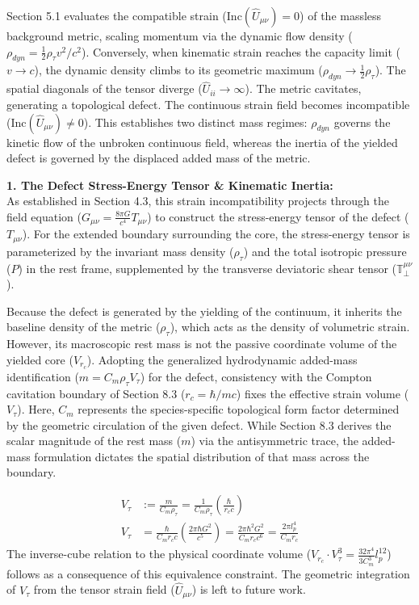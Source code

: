 Section 5.1 evaluates the compatible strain ($\text{Inc}(\hat{U}_{\mu\nu}) = 0$) of the massless background metric, scaling momentum via the dynamic flow density ($\rho_{dyn} = \frac{1}{2}\rho_\tau v^2/c^2$). Conversely, when kinematic strain reaches the capacity limit ($v \to c$), the dynamic density climbs to its geometric maximum ($\rho_{dyn} \to \frac{1}{2}\rho_\tau$). The spatial diagonals of the tensor diverge ($\hat{U}_{ii} \to \infty$). The metric cavitates, generating a topological defect. The continuous strain field becomes incompatible ($\text{Inc}(\hat{U}_{\mu\nu}) \neq 0$). This establishes two distinct mass regimes: $\rho_{dyn}$ governs the kinetic flow of the unbroken continuous field, whereas the inertia of the yielded defect is governed by the displaced added mass of the metric. 
\vspace{0.2 cm}

\textbf{1. The Defect Stress-Energy Tensor \& Kinematic Inertia:} \\
As established in Section 4.3, this strain incompatibility projects through the field equation ($G_{\mu\nu} = \frac{8\pi G}{c^4} T_{\mu\nu}$) to construct the stress-energy tensor of the defect ($T_{\mu\nu}$). For the extended boundary surrounding the core, the stress-energy tensor is parameterized by the invariant mass density ($\rho_\tau$) and the total isotropic pressure ($P$) in the rest frame, supplemented by the transverse deviatoric shear tensor ($\mathbb{T}_{\perp}^{\mu\nu}$). 

Because the defect is generated by the yielding of the continuum, it inherits the baseline density of the metric ($\rho_\tau$), which acts as the density of volumetric strain. However, its macroscopic rest mass is not the passive coordinate volume of the yielded core ($V_{r_c}$). Adopting the generalized hydrodynamic added-mass identification ($m = C_m \rho_\tau V_\tau$) for the defect, consistency with the Compton cavitation boundary of Section 8.3 ($r_c = \hbar/mc$) fixes the effective strain volume ($V_\tau$). Here, $C_m$ represents the species-specific topological form factor determined by the geometric circulation of the given defect. While Section 8.3 derives the scalar magnitude of the rest mass ($m$) via the antisymmetric trace, the added-mass formulation dictates the spatial distribution of that mass across the boundary. 

\begin{align}
    V_\tau &:= \frac{m}{C_m \rho_\tau} = \frac{1}{C_m \rho_\tau} \left( \frac{\hbar}{r_c c} \right) \nonumber \\ 
    V_\tau &= \frac{\hbar}{C_m r_c c} \left( \frac{2\pi\hbar G^2}{c^5} \right) = \frac{2\pi \hbar^2 G^2}{C_m r_c c^6} = \frac{2\pi l_p^4}{C_m r_c} 
\end{align}
The inverse-cube relation to the physical coordinate volume ($V_{r_c} \cdot V_\tau^3 = \frac{32\pi^4}{3C_m^3} l_p^{12}$) follows as a consequence of this equivalence constraint. The geometric integration of $V_\tau$ from the tensor strain field ($\hat{U}_{\mu\nu}$) is left to future work. 

